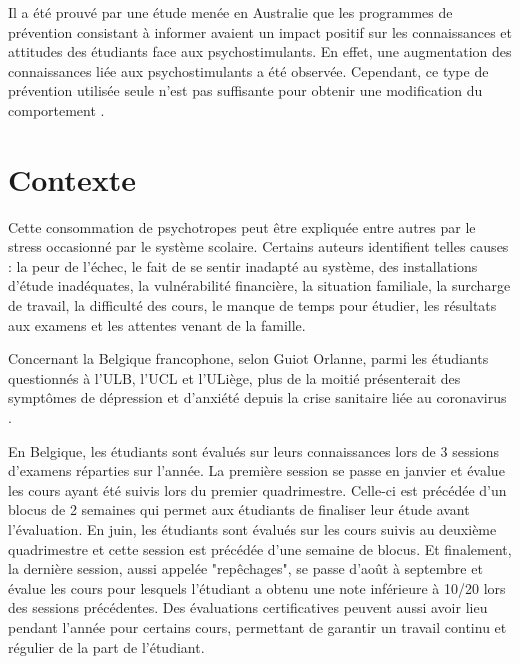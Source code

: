 Il a été prouvé par une étude menée en Australie que les programmes de prévention consistant à informer avaient un impact positif sur les connaissances et attitudes des étudiants face aux psychostimulants. En effet, une augmentation des connaissances liée aux psychostimulants a été observée. Cependant, ce type de prévention utilisée seule n'est pas suffisante pour obtenir une modification du comportement \parencite{vogl_universal_2014}.



\section{Contexte}

Cette consommation de psychotropes peut être expliquée entre autres par le stress occasionné par le système scolaire. Certains auteurs identifient telles causes : la peur de l'échec, le fait de se sentir inadapté au système, des installations d'étude inadéquates, la vulnérabilité financière, la situation familiale, la surcharge de travail, la difficulté des cours, le manque de temps pour étudier, les résultats aux examens et les attentes venant de la famille\parencite{jayasankara_reddy_academic_2018, stankovska_bces_2018, ul_haq_psychometric_2018}. \newline

Concernant la Belgique francophone, selon  Guiot Orlanne, parmi les étudiants questionnés à l'ULB, l'UCL et l'ULiège, plus de la moitié présenterait des symptômes de dépression et d'anxiété depuis la crise sanitaire liée au coronavirus \parencite{orlanne_souffrir_2021}. \newline

En Belgique, les étudiants sont évalués sur leurs connaissances lors de 3 sessions d'examens réparties sur l'année. La première session se passe en janvier et évalue les cours ayant été suivis lors du premier quadrimestre. Celle-ci est précédée d'un blocus de 2 semaines qui permet aux étudiants de finaliser leur étude avant l'évaluation. En juin, les étudiants sont évalués sur les cours suivis au deuxième quadrimestre et cette session est précédée d'une semaine de blocus. Et finalement, la dernière session, aussi appelée "repêchages", se passe d'août à septembre et évalue les cours pour lesquels l'étudiant a obtenu une note inférieure à 10/20 lors des sessions précédentes. Des évaluations certificatives peuvent aussi avoir lieu
pendant l'année pour certains cours, permettant de garantir un travail continu et régulier de la part de l'étudiant. \newline

